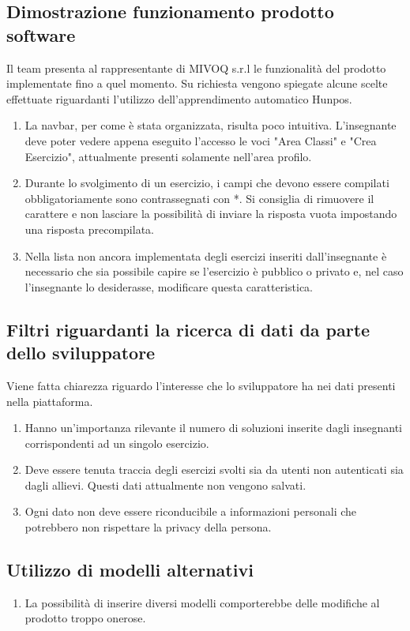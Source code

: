 \documentclass[11pt,a4paper]{article}
\begin{document}
	\subsection{Dimostrazione funzionamento prodotto software}
	Il team presenta al rappresentante di MIVOQ s.r.l le funzionalità del prodotto implementate fino a quel momento.
	Su richiesta vengono spiegate alcune scelte effettuate riguardanti l'utilizzo dell'apprendimento automatico Hunpos.
	\begin{enumerate}
		\item La navbar, per come è stata organizzata, risulta poco intuitiva. L'insegnante deve poter vedere appena eseguito l'accesso le voci "Area Classi" e "Crea Esercizio", attualmente presenti solamente nell'area profilo.
		\item Durante lo svolgimento di un esercizio, i campi che devono essere compilati obbligatoriamente sono contrassegnati con *. Si consiglia di rimuovere il carattere e non lasciare la possibilità di inviare la risposta vuota impostando una risposta precompilata. 
		\item Nella lista non ancora implementata degli esercizi inseriti dall'insegnante è necessario che sia possibile capire se l'esercizio è pubblico o privato e, nel caso l'insegnante lo desiderasse, modificare questa caratteristica.
	\end{enumerate}
	
	\subsection{Filtri riguardanti la ricerca di dati da parte dello sviluppatore}
	Viene fatta chiarezza riguardo l'interesse che lo sviluppatore ha nei dati presenti nella piattaforma.
	\begin{enumerate}
		\item Hanno un'importanza rilevante il numero di soluzioni  inserite dagli insegnanti corrispondenti ad un singolo esercizio.
		\item Deve essere tenuta traccia degli esercizi svolti sia da utenti non autenticati sia dagli allievi. Questi dati attualmente non vengono salvati.
		\item Ogni dato non deve essere riconducibile a informazioni personali che potrebbero non rispettare la privacy della persona.
	\end{enumerate}     
	
	\subsection{Utilizzo di modelli alternativi}
	\begin{enumerate}
		\item La possibilità di inserire diversi modelli comporterebbe delle modifiche al prodotto troppo onerose. 
	\end{enumerate} 
	
\end{document}
